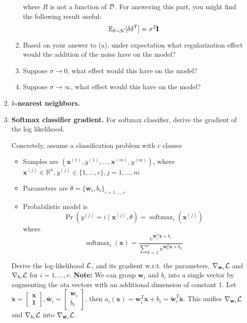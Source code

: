 \documentclass{article}
\newcommand{\R}{\mathbb{R}}
\newcommand{\x}{\bf{x}}
\newcommand{\w}{\bf{w}}
\DeclareMathOperator{\sm}{softmax}
\renewcommand{\bf}[1]{\textbf{{#1}}}
\begin{document}
\begin{enumerate}
\begin{enumerate}
                    where $R$ is not a function of $\cal{D}$. For answering this part, you might find the following result useful:
                    \[\mathbb{E}_{\delta \sim {\cal{N}}} [\delta \delta^T] = \sigma^2 \bf{I}\]
                \item Based on your answer to (a), under expectation what regularization effect
                    would the addition of the noise have on the model?
                \item Suppose $\sigma \longrightarrow 0$, what effect would this have on the model?
                \item Suppose $\sigma \longrightarrow \infty$, what effect would this have on the model?
            \end{enumerate}

        \item \bf{$k$-nearest neighbors.}

        \item \bf{Softmax classifier gradient.} For softmax classifier, derive the gradient of the log
            likelihood. \vspace{10pt}

            Concretely, assume a classification problem with $c$ classes
            \begin{itemize}
                \item Samples are $(\x^{(1)}, y^{(1)}, \ldots, \x^{(m)}, y^{(m)})$, where 
                    $\x^{(j)} \in \R^n, y^{(j)} \in \{1, \ldots, c\}, j = 1, \ldots, m$
                \item Parameters are $\theta = \{\w_{i}, b_i\}_{i = 1, \ldots, c}$
                \item Probabilistic model is
                    \[\Pr \left( y^{(j)} = i \mid \x^{(j)}, \theta \right) = \sm_i(\x^{(j)})\]
                    where
                    \[\sm_i (\x) = \frac{e^{\w^{T}_{i} \x + b_i}}{\sum^{c}_{k = 1} e^{\w^{T}_{k} \x + b_k}}\]
            \end{itemize}
            Derive the log-likelihood $\cal{L}$, and its gradient w.r.t. the parameters,
            $\nabla_{\w_i} {\cal{L}}$ and $\nabla_{b_i} {\cal{L}}$ for $i = 1, \ldots, c$.
            \newline 
            \bf{Note:} We can group $\w_i$ and $b_i$ into a single vector by augmenting the ata vectors
            with an additional dimension of constant $1$. Let $\tilde{\x} = \begin{bmatrix} \x \\ \bf{1} \end{bmatrix},
            \tilde{\w_i} = \begin{bmatrix} \w_i \\ b_i \end{bmatrix}$, then 
            $a_i(\x) = \w^{T}_{i} \x + b_i = \tilde{\w}^{T}_{i} \tilde{\x}$. This unifies
            $\nabla_{\w_i} {\cal{L}}$ and $\nabla_{b_i} {\cal{L}}$ into $\nabla_{\tilde{\w_i}} {\cal{L}}$.
            

\end{enumerate}
\end{document}
